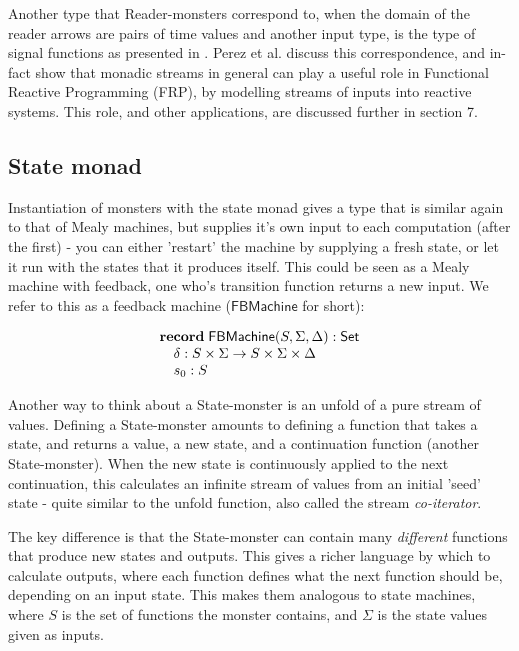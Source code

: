 \documentclass{article}
\begin{document}
Another type that Reader-monsters correspond to, when the domain of the reader arrows are pairs of time values and another input type, is the type of signal functions as presented in \cite{frp_refactored}. Perez et al. discuss this correspondence, and in-fact show that monadic streams in general can play a useful role in Functional Reactive Programming (FRP), by modelling streams of inputs into reactive systems. This role, and other applications, are discussed further in section 7.
                             
\subsection{State monad}

Instantiation of monsters with the state monad gives a type that is similar again to that of Mealy machines, but supplies it's own input to each computation (after the first) - you can either 'restart' the machine by supplying a fresh state, or let it run with the states that it produces itself. This could be seen as a Mealy machine with feedback, one who's transition function returns a new input. We refer to this as a feedback machine ($\mathsf{FBMachine}$ for short):

$$
\begin{array}[t]{l}
\mathbf{record}\;
\mathsf{FBMachine}(S,\Sigma,\Delta):\mathsf{Set}\\
\quad \delta : S \times \Sigma \to S \times \Sigma \times \Delta \\
\quad s_0 : S
\end{array}
$$

Another way to think about a State-monster is an unfold of a pure stream of values. Defining a State-monster amounts to defining a function that takes a state, and returns a value, a new state, and a continuation function (another State-monster). When the new state is continuously applied to the next continuation, this calculates an infinite stream of values from an initial 'seed' state - quite similar to the unfold function, also called the stream \emph{co-iterator}.

The key difference is that the State-monster can contain many \emph{different} functions that produce new states and outputs. This gives a richer language by which to calculate outputs, where each function defines what the next function should be, depending on an input state. This makes them analogous to state machines, where $S$ is the set of functions the monster contains, and $\Sigma$ is the state values given as inputs.
\end{document}
